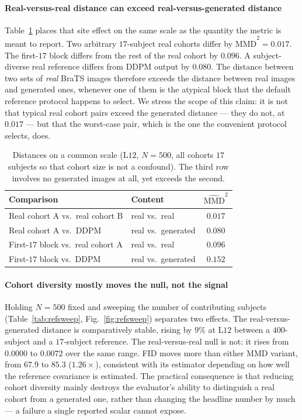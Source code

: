 \documentclass[preprint,12pt,authoryear]{elsarticle}
\newcommand{\mmd}{\mathrm{MMD}}
\newcommand{\Lb}[1]{\ensuremath{\mathrm{L}#1}}
\begin{document}
\paragraph{Real-versus-real distance can exceed real-versus-generated distance}
Table~\ref{tab:realreal} places that site effect on the same scale as the
quantity the metric is meant to report. Two arbitrary $17$-subject real cohorts
differ by $\widehat{\mmd}^2 = 0.017$. The first-$17$ block differs from the rest
of the real cohort by $0.096$. A subject-diverse real reference differs from
DDPM output by $0.080$. The distance between two sets of \emph{real} BraTS
images therefore exceeds the distance between real images and generated ones,
whenever one of them is the atypical block that the default reference protocol
happens to select. We stress the scope of this claim: it is
not that typical real cohort pairs exceed the generated distance --- they do
not, at $0.017$ --- but that the worst-case pair, which is the one the
convenient protocol selects, does.

\begin{table}[t]
\centering
\caption{Distances on a common scale (\Lb{12}, $N = 500$, all cohorts
$17$ subjects so that cohort size is not a confound). The third row involves no
generated images at all, yet exceeds the second.}
\label{tab:realreal}
\begin{tabular}{llc}
\toprule
Comparison & Content & $\widehat{\mmd}^2$ \\
\midrule
Real cohort A vs.\ real cohort B     & real vs.\ real      & $0.017$ \\
Real cohort A vs.\ DDPM              & real vs.\ generated & $0.080$ \\
First-$17$ block vs.\ real cohort A  & real vs.\ real      & $\mathbf{0.096}$ \\
First-$17$ block vs.\ DDPM           & real vs.\ generated & $0.152$ \\
\bottomrule
\end{tabular}
\end{table}

\paragraph{Cohort diversity mostly moves the null, not the signal}
Holding $N = 500$ fixed and sweeping the number of contributing subjects
(Table~\ref{tab:refsweep}, Fig.~\ref{fig:refsweep}) separates two effects. The
real-versus-generated distance is comparatively stable, rising by $9\%$ at
\Lb{12} between a $400$-subject and a $17$-subject reference. The
real-versus-real null is not: it rises from $0.0000$ to $0.0072$ over the same
range. FID moves more than either MMD variant, from $67.9$ to $85.3$
($1.26\times$), consistent with its estimator depending on how well the
reference covariance is estimated. The practical consequence is that reducing
cohort diversity mainly destroys the evaluator's ability to distinguish a real
cohort from a generated one, rather than changing the headline number by much
--- a failure a single reported scalar cannot expose.
\end{document}
